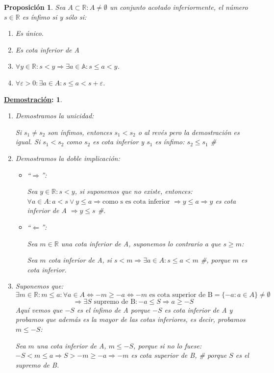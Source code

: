 \documentclass[10pt,a4paper,openright]{book}
\theoremstyle{break}
\newtheorem*{prop}{Proposición}
\newtheorem*{demo}{\underline{Demostración}:}
\begin{document}
\begin{prop}
Sea $A\subset \mathbb R: A\neq \emptyset$ un conjunto acotado inferiormente, el número $s\in \mathbb R$ es ínfimo si y sólo si:
\begin{enumerate}
\item Es único.
\item Es cota inferior de A
\item $\forall y\in \mathbb R: s<y\Rightarrow \exists a\in \mathbb A: s\leq a<y$.
\item $\forall \varepsilon>0: \exists a\in A: s\leq a<s+\varepsilon$.
\end{enumerate}
\end{prop}
\begin{demo}
\begin{enumerate}
\item Demostramos la unicidad:\par
Si $s_1\neq s_2$ son ínfimos, entonces $s_1<s_2$ o al revés pero la demostración es igual. Si $s_1<s_2$ como $s_2$ es cota inferior y $s_1$ es ínfimo: $s_2\leq s_1$ \#

\item Demostramos la doble implicación:
	\begin{itemize}
	\item ``$\Rightarrow$'':\par
	Sea $y\in \mathbb R: s<y$, si suponemos que no existe, entonces: $\forall a \in  A: a<s\vee y\leq a\Rightarrow\mbox{como s es cota inferior }\Rightarrow  y\leq a\Rightarrow y$ es cota inferior de A $\Rightarrow y\leq s$ \#.
	\item ``$\Leftarrow$'':\par
	Sea $m\in \mathbb R$ una cota inferior de A, suponemos lo contrario a que $s\geq m$:\par
	Sea $m$ cota inferior de A, si $s<m\Rightarrow \exists a\in A: s\leq a<m$ \#, porque $m$ es cota inferior.
	\end{itemize}
	
\item Suponemos que:
$$\exists m\in \mathbb R: m\leq a: \forall a\in A\Leftrightarrow -m\geq -a\Leftrightarrow -m\mbox{ es cota superior de B}=\{-a: a\in A\}\neq \emptyset$$
$$\Rightarrow \exists S\mbox{ supremo de B}: -a\leq S\Rightarrow a\geq -S$$
Aquí vemos que $-S$ es el ínfimo de A porque $-S$ es cota inferior de A y probamos que además es la mayor de las cotas inferiores, es decir, probamos $m\leq -S$:\par
Sea $m$ una cota inferior de A, $m\leq -S$, porque si no lo fuese:
$-S<m\leq a\Rightarrow S>-m\geq -a\Rightarrow -m$ es cota superior de B, \# porque $S$ es el supremo de B.
\end{enumerate}
\end{demo}
\end{document}

